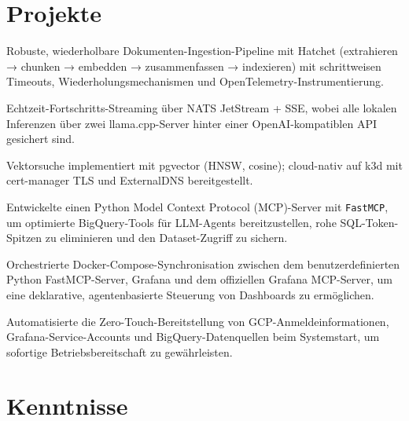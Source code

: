 \documentclass[10pt,a4paper]{resume}
\begin{document}
\vspace{2pt}

\section{Projekte}

\bullets
  \item Robuste, wiederholbare Dokumenten-Ingestion-Pipeline mit Hatchet (extrahieren → chunken → embedden → zusammenfassen → indexieren) mit schrittweisen Timeouts, Wiederholungsmechanismen und OpenTelemetry-Instrumentierung.
  \item Echtzeit-Fortschritts-Streaming über NATS JetStream + SSE, wobei alle lokalen Inferenzen über zwei llama.cpp-Server hinter einer OpenAI-kompatiblen API gesichert sind.
  \item Vektorsuche implementiert mit pgvector (HNSW, cosine); cloud-nativ auf k3d mit cert-manager TLS und ExternalDNS bereitgestellt.
\bulletsend
\vspace{1.0pt}
\bullets
  \item Entwickelte einen Python Model Context Protocol (MCP)-Server mit \texttt{FastMCP}, um optimierte BigQuery-Tools für LLM-Agents bereitzustellen, rohe SQL-Token-Spitzen zu eliminieren und den Dataset-Zugriff zu sichern.
  \item Orchestrierte Docker-Compose-Synchronisation zwischen dem benutzerdefinierten Python FastMCP-Server, Grafana und dem offiziellen Grafana MCP-Server, um eine deklarative, agentenbasierte Steuerung von Dashboards zu ermöglichen.
  \item Automatisierte die Zero-Touch-Bereitstellung von GCP-Anmeldeinformationen, Grafana-Service-Accounts und BigQuery-Datenquellen beim Systemstart, um sofortige Betriebsbereitschaft zu gewährleisten.
\bulletsend

\section{Kenntnisse}
\end{document}
